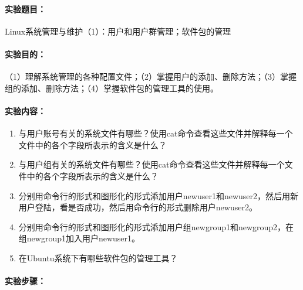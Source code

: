 \documentclass[cs4size,a4paper,nofonts]{ctexart}
\def\titlec{Linux系统管理与维护（1）：用户和用户群管理；软件包的管理}
\begin{document}




\paragraph{实验题目：}\titlec

\paragraph{实验目的：}
（1）理解系统管理的各种配置文件；（2）掌握用户的添加、删除方法；（3）掌握组的添加、删除方法；（4）掌握软件包的管理工具的使用。

\paragraph{实验内容：}
\begin{enumerate}
\item 与用户账号有关的系统文件有哪些？使用cat命令查看这些文件并解释每一个文件中的各个字段所表示的含义是什么？
\item 与用户组有关的系统文件有哪些？使用cat命令查看这些文件并解释每一个文件中的各个字段所表示的含义是什么？
\item 分别用命令行的形式和图形化的形式添加用户newuser1和newuser2，然后用新用户登陆，看是否成功，然后用命令行的形式删除用户newuser2。
\item 分别用命令行的形式和图形化的形式添加用户组newgroup1和newgroup2，在组newgroup1加入用户newuser1。
\item 在Ubuntu系统下有哪些软件包的管理工具？
\end{enumerate}

\paragraph{实验步骤：}

\newcommand{\image}[3][width=\textwidth]{
  \begin{minipage}[t]{0.5\textwidth}
    \centering
        \texttt{[image: images/exp6/\#2.png]}
    \caption{#3}
    \label{fig:#3}
  \end{minipage}
}
\end{document}
